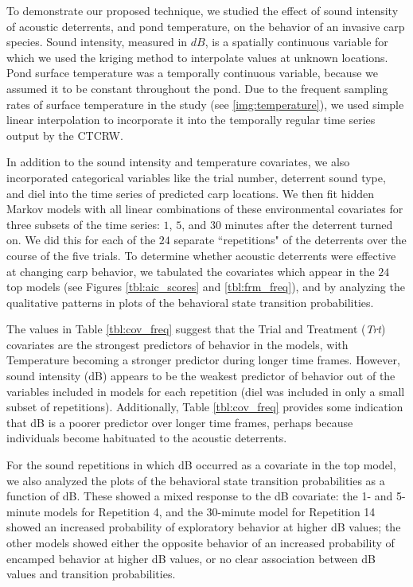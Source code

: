 \documentclass[12pt]{article}
\begin{document}
	To demonstrate our proposed technique, we studied the effect of sound intensity of acoustic deterrents, and pond temperature, on the behavior of an invasive carp species. Sound intensity, measured in $dB$, is a spatially continuous variable for which we used the kriging method to interpolate values at unknown locations. Pond surface temperature was a temporally continuous variable, because we assumed it to be constant throughout the pond. Due to the frequent sampling rates of surface temperature in the study (see \ref{img:temperature}), we used simple linear interpolation to incorporate it into the temporally regular time series output by the CTCRW.
	
	In addition to the sound intensity and temperature covariates, we also incorporated categorical variables like the trial number, deterrent sound type, and diel into the time series of predicted carp locations. We then fit hidden Markov models with all linear combinations of these environmental covariates for three subsets of the time series: $1$, $5$, and $30$ minutes after the deterrent turned on. We did this for each of the $24$ separate ``repetitions" of the deterrents over the course of the five trials. To determine whether acoustic deterrents were effective at changing carp behavior, we tabulated the covariates which appear in the $24$ top models (see Figures \ref{tbl:aic_scores} and \ref{tbl:frm_freq}), and by analyzing the qualitative patterns in plots of the behavioral state transition probabilities.
	
	The values in Table \ref{tbl:cov_freq} suggest that the Trial and Treatment (\emph{Trt}) covariates are the strongest predictors of behavior in the models, with Temperature becoming a stronger predictor during longer time frames. However, sound intensity (dB) appears to be the weakest predictor of behavior out of the variables included in models for each repetition (diel was included in only a small subset of repetitions). Additionally, Table \ref{tbl:cov_freq} provides some indication that dB is a poorer predictor over longer time frames, perhaps because individuals become habituated to the acoustic deterrents. 
	
	For the sound repetitions in which dB occurred as a covariate in the top model, we also analyzed the plots of the behavioral state transition probabilities as a function of dB. These showed a mixed response to the dB covariate: the 1- and 5-minute models for Repetition 4, and the 30-minute model for Repetition 14 showed an increased probability of exploratory behavior at higher dB values; the other models showed either the opposite behavior of an increased probability of encamped behavior at higher dB values, or no clear association between dB values and transition probabilities.
	
\end{document}
